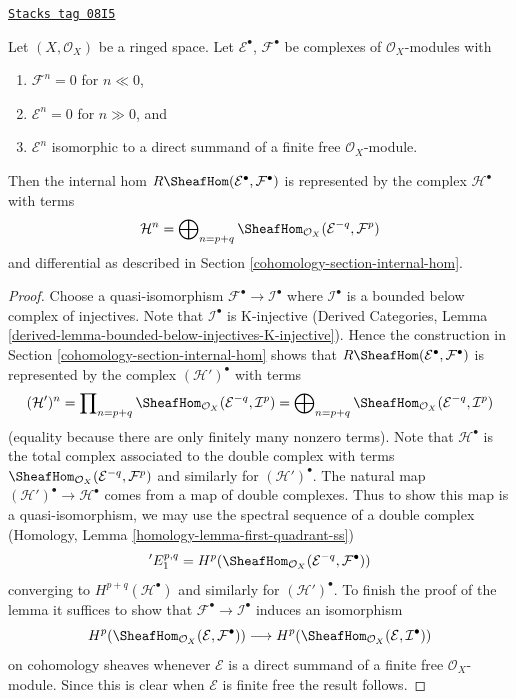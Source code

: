 \begin{lemma}
\label{cohomology-lemma-Rhom-complex-of-direct-summands-finite-free}
\href{https://stacks.math.columbia.edu/tag/08I5}{\texttt{Stacks tag 08I5}}

Let $(X, \mathcal{O}_X)$ be a ringed space.
Let $\mathcal{E}^\bullet$, $\mathcal{F}^\bullet$ be complexes
of $\mathcal{O}_X$-modules with
\begin{enumerate}
\item $\mathcal{F}^n = 0$ for $n \ll 0$,
\item $\mathcal{E}^n = 0$ for $n \gg 0$, and
\item $\mathcal{E}^n$ isomorphic to a direct summand of a finite
free $\mathcal{O}_X$-module.
\end{enumerate}
Then the internal hom $R\SheafHom(\mathcal{E}^\bullet, \mathcal{F}^\bullet)$
is represented by the complex $\mathcal{H}^\bullet$ with terms
$$
\mathcal{H}^n =
\bigoplus\nolimits_{n = p + q}
\SheafHom_{\mathcal{O}_X}(\mathcal{E}^{-q}, \mathcal{F}^p)
$$
and differential as described in Section \ref{cohomology-section-internal-hom}.
\end{lemma}

\begin{proof}
Choose a quasi-isomorphism $\mathcal{F}^\bullet \to \mathcal{I}^\bullet$
where $\mathcal{I}^\bullet$ is a bounded below complex of injectives.
Note that $\mathcal{I}^\bullet$ is K-injective
(Derived Categories, Lemma
\ref{derived-lemma-bounded-below-injectives-K-injective}).
Hence the construction in Section \ref{cohomology-section-internal-hom}
shows that
$R\SheafHom(\mathcal{E}^\bullet, \mathcal{F}^\bullet)$ is
represented by the complex $(\mathcal{H}')^\bullet$ with terms
$$
(\mathcal{H}')^n =
\prod\nolimits_{n = p + q}
\SheafHom_{\mathcal{O}_X}(\mathcal{E}^{-q}, \mathcal{I}^p) =
\bigoplus\nolimits_{n = p + q}
\SheafHom_{\mathcal{O}_X}(\mathcal{E}^{-q}, \mathcal{I}^p)
$$
(equality because there are only finitely many nonzero terms).
Note that $\mathcal{H}^\bullet$ is the total complex associated to
the double complex with terms
$\SheafHom_{\mathcal{O}_X}(\mathcal{E}^{-q}, \mathcal{F}^p)$
and similarly for $(\mathcal{H}')^\bullet$.
The natural map $(\mathcal{H}')^\bullet \to \mathcal{H}^\bullet$
comes from a map of double complexes.
Thus to show this map is a quasi-isomorphism, we may use the spectral
sequence of a double complex
(Homology, Lemma \ref{homology-lemma-first-quadrant-ss})
$$
{}'E_1^{p, q} =
H^p(\SheafHom_{\mathcal{O}_X}(\mathcal{E}^{-q}, \mathcal{F}^\bullet))
$$
converging to $H^{p + q}(\mathcal{H}^\bullet)$ and similarly for
$(\mathcal{H}')^\bullet$. To finish the proof of the lemma it
suffices to show that $\mathcal{F}^\bullet \to \mathcal{I}^\bullet$
induces an isomorphism
$$
H^p(\SheafHom_{\mathcal{O}_X}(\mathcal{E}, \mathcal{F}^\bullet))
\longrightarrow
H^p(\SheafHom_{\mathcal{O}_X}(\mathcal{E}, \mathcal{I}^\bullet))
$$
on cohomology sheaves whenever $\mathcal{E}$ is a direct summand of a
finite free $\mathcal{O}_X$-module. Since this is clear when $\mathcal{E}$
is finite free the result follows.
\end{proof}

